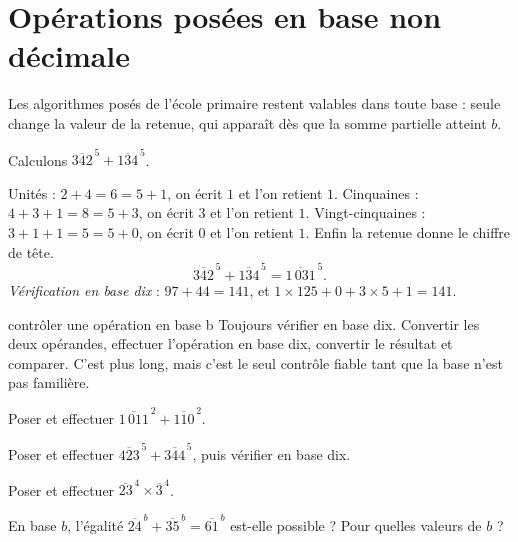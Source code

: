 \section{Opérations posées en base non décimale}

\begin{propriete}
Les algorithmes posés de l'école primaire restent valables dans toute base :
seule change la valeur de la retenue, qui apparaît dès que la somme partielle
atteint $b$.
\end{propriete}

\begin{exemple}
Calculons $\overline{342}^{\,5}+\overline{134}^{\,5}$.

Unités : $2+4 = 6 = 5+1$, on écrit $1$ et l'on retient $1$.
Cinquaines : $4+3+1 = 8 = 5+3$, on écrit $3$ et l'on retient $1$.
Vingt-cinquaines : $3+1+1 = 5 = 5+0$, on écrit $0$ et l'on retient $1$.
Enfin la retenue donne le chiffre de tête.
\[
  \overline{342}^{\,5}+\overline{134}^{\,5} = \overline{1\,031}^{\,5}.
\]
\emph{Vérification en base dix} : $97+44 = 141$, et
$1\times125+0+3\times5+1 = 141$.
\end{exemple}

\begin{methode}{contrôler une opération en base b}
Toujours vérifier en base dix. Convertir les deux opérandes, effectuer
l'opération en base dix, convertir le résultat et comparer. C'est plus long,
mais c'est le seul contrôle fiable tant que la base n'est pas familière.
\end{methode}

\begin{entrainement}[opérations]
\exo[\niveau{1}] Poser et effectuer
$\overline{1\,011}^{\,2}+\overline{110}^{\,2}$.

\exo[\niveau{2}] Poser et effectuer
$\overline{423}^{\,5}+\overline{344}^{\,5}$, puis vérifier en base dix.

\exo[\niveau{2}] Poser et effectuer $\overline{23}^{\,4}\times
\overline{3}^{\,4}$.

\exo[\niveau{3}] En base $b$, l'égalité $\overline{24}^{\,b}+\overline{35}^{\,b}
= \overline{61}^{\,b}$ est-elle possible ? Pour quelles valeurs de $b$ ?
\end{entrainement}

